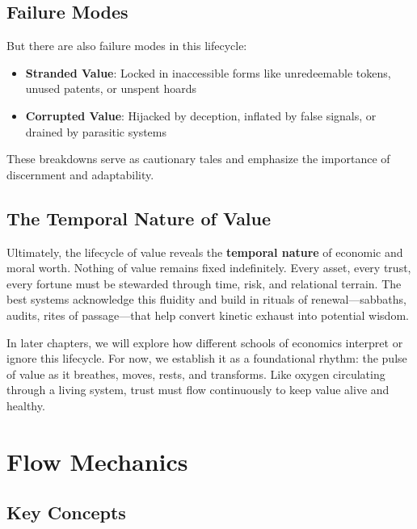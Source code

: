 \documentclass[11pt,oneside]{book}
\begin{document}
\section{Failure Modes}

But there are also failure modes in this lifecycle:

\begin{itemize}
\item \textbf{Stranded Value}: Locked in inaccessible forms like unredeemable tokens, unused patents, or unspent hoards
\item \textbf{Corrupted Value}: Hijacked by deception, inflated by false signals, or drained by parasitic systems
\end{itemize}

These breakdowns serve as cautionary tales and emphasize the importance of discernment and adaptability.

\section{The Temporal Nature of Value}

Ultimately, the lifecycle of value reveals the \textbf{temporal nature} of economic and moral worth. Nothing of value remains fixed indefinitely. Every asset, every trust, every fortune must be stewarded through time, risk, and relational terrain. The best systems acknowledge this fluidity and build in rituals of renewal—sabbaths, audits, rites of passage—that help convert kinetic exhaust into potential wisdom.

In later chapters, we will explore how different schools of economics interpret or ignore this lifecycle. For now, we establish it as a foundational rhythm: the pulse of value as it breathes, moves, rests, and transforms. Like oxygen circulating through a living system, trust must flow continuously to keep value alive and healthy.


\chapter{ Flow Mechanics}

\section{Key Concepts}
\end{document}
